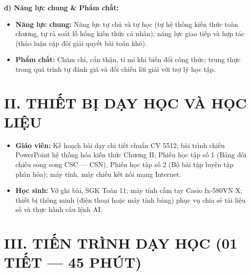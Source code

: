 \documentclass[12pt, a4paper]{article}
\begin{document}
\textbf{d) Năng lực chung \& Phẩm chất:}
\begin{itemize}[leftmargin=1.5em]
    \item \textbf{Năng lực chung:} Năng lực tự chủ và tự học (tự hệ thống kiến thức toàn chương, tự rà soát lỗ hổng kiến thức cá nhân); năng lực giao tiếp và hợp tác (thảo luận cặp đôi giải quyết bài toán khó).
    \item \textbf{Phẩm chất:} Chăm chỉ, cẩn thận, tỉ mỉ khi biến đổi công thức; trung thực trong quá trình tự đánh giá và đối chiếu lời giải với trợ lý học tập.
\end{itemize}

\section*{II. THIẾT BỊ DẠY HỌC VÀ HỌC LIỆU}
\begin{itemize}[leftmargin=1.5em]
    \item \textbf{Giáo viên:} Kế hoạch bài dạy chi tiết chuẩn CV 5512; bài trình chiếu PowerPoint hệ thống hóa kiến thức Chương II; Phiếu học tập số 1 (Bảng đối chiếu song song CSC --- CSN), Phiếu học tập số 2 (Bộ bài tập luyện tập phân hóa); máy tính, máy chiếu kết nối mạng Internet.
    \item \textbf{Học sinh:} Vở ghi bài, SGK Toán 11; máy tính cầm tay Casio fx-580VN X; thiết bị thông minh (điện thoại hoặc máy tính bảng) phục vụ chia sẻ tài liệu số và thực hành câu lệnh AI.
\end{itemize}

\section*{III. TIẾN TRÌNH DẠY HỌC (01 TIẾT --- 45 PHÚT)}

\begin{center}
\end{center}
\end{document}
